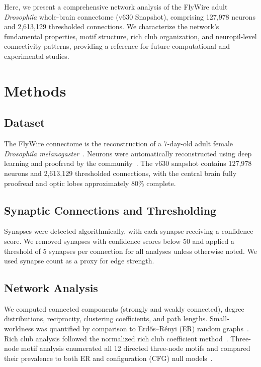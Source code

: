 \documentclass[11pt]{article}
\begin{document}
Here, we present a comprehensive network analysis of the FlyWire adult \textit{Drosophila} whole-brain connectome (v630 Snapshot), comprising 127,978 neurons and 2,613,129 thresholded connections. We characterize the network's fundamental properties, motif structure, rich club organization, and neuropil-level connectivity patterns, providing a reference for future computational and experimental studies.

\section{Methods}

\subsection{Dataset}

The FlyWire connectome is the reconstruction of a 7-day-old adult female \textit{Drosophila melanogaster}~\citep{zheng2018complete}. Neurons were automatically reconstructed using deep learning and proofread by the community~\citep{dorkenwald2022flywire,dorkenwald2023neuronal}. The v630 snapshot contains 127,978 neurons and 2,613,129 thresholded connections, with the central brain fully proofread and optic lobes approximately 80\% complete.

\subsection{Synaptic Connections and Thresholding}

Synapses were detected algorithmically, with each synapse receiving a confidence score. We removed synapses with confidence scores below 50 and applied a threshold of 5 synapses per connection for all analyses unless otherwise noted. We used synapse count as a proxy for edge strength.

\subsection{Network Analysis}

We computed connected components (strongly and weakly connected), degree distributions, reciprocity, clustering coefficients, and path lengths. Small-worldness was quantified by comparison to Erd\H{o}s--R\'enyi (ER) random graphs~\citep{humphries2008network}. Rich club analysis followed the normalized rich club coefficient method~\citep{colizza2006detecting}. Three-node motif analysis enumerated all 12 directed three-node motifs and compared their prevalence to both ER and configuration (CFG) null models~\citep{milo2002network,sporns2004motifs}.
\end{document}
